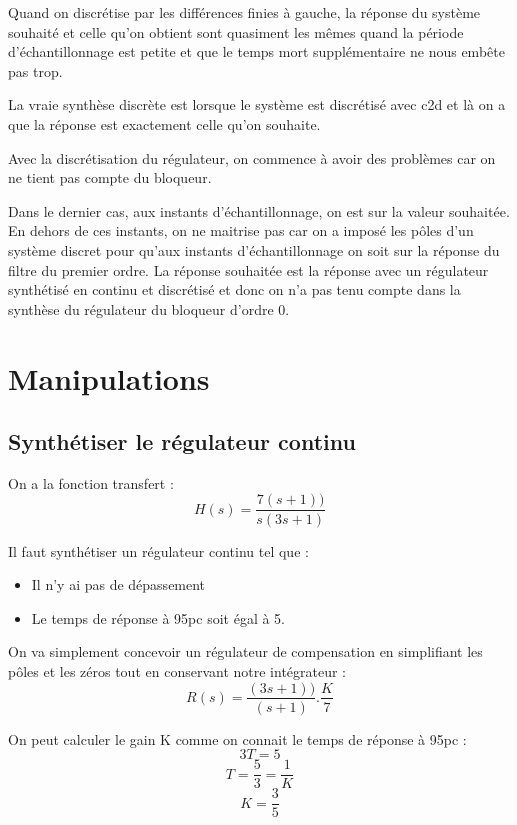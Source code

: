 Quand on discrétise par les différences finies à gauche, la réponse du système souhaité et celle qu'on obtient sont quasiment les mêmes quand la période d'échantillonnage est petite et que le temps mort supplémentaire ne nous embête pas trop.

La vraie synthèse discrète est lorsque le système est discrétisé avec c2d et là on a que la réponse est exactement celle qu'on souhaite.

Avec la discrétisation du régulateur, on commence à avoir des problèmes car on ne tient pas compte du bloqueur.

Dans le dernier cas, aux instants d'échantillonnage, on est sur la valeur souhaitée. En dehors de ces instants, on ne maitrise pas car on a imposé les pôles d'un système discret pour qu'aux instants d'échantillonnage on soit sur la réponse du filtre du premier ordre.
La réponse souhaitée est la réponse avec un régulateur synthétisé en continu et discrétisé et donc on n'a pas tenu compte dans la synthèse du régulateur du bloqueur d'ordre 0.


\section{Manipulations}
\subsection{Synthétiser le régulateur continu}
On a la fonction transfert :\\

$$H(s) = \frac{7(s+1))}{s(3s+1)}$$

Il faut synthétiser un régulateur continu tel que :
\begin{itemize}
    \item Il n'y ai pas de dépassement
    \item Le temps de réponse à 95pc soit égal à 5.
\end{itemize}

On va simplement concevoir un régulateur de compensation en simplifiant les pôles et les zéros tout en conservant notre intégrateur :\\


$$R(s) = \frac{(3s+1))}{(s+1)}.\frac{K}{7}$$


On peut calculer le gain K comme on connait le temps de réponse à 95pc :\\


$$3T = 5$$
$$T = \frac{5}{3} = \frac{1}{K}$$ 
$$K = \frac{3}{5}$$



